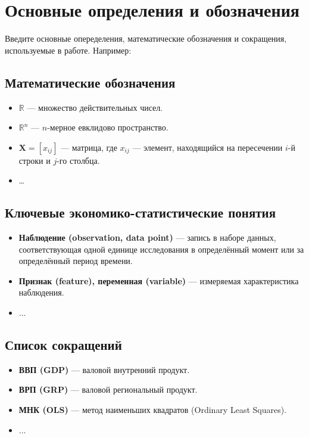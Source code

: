 \documentclass[a4paper,12pt]{article}
\begin{document}
\newpage

\section{Основные определения и обозначения}
\label{sec:definitions}

Введите основные опеределения, математические обозначения и сокращения, используемые в работе. Например:

\subsection*{Математические обозначения}

\begin{itemize}
    \item $\mathbb{R}$ --- множество действительных чисел.
    \item $\mathbb{R}^n$ --- $n$-мерное евклидово пространство.
    \item $\mathbf{X} = [x_{ij}]$ --- матрица, где $x_{ij}$ --- элемент, находящийся на пересечении $i$-й строки и $j$-го столбца.
    \item \ldots
\end{itemize}

\subsection*{Ключевые экономико-статистические понятия}

\begin{itemize}
    \item \textbf{Наблюдение (observation, data point)} --- запись в наборе данных, соответствующая одной единице исследования в определённый момент или за определённый период времени.
    \item \textbf{Признак (feature), переменная (variable)} --- измеряемая характеристика наблюдения.
    \item ...
\end{itemize}

\subsection*{Список сокращений}

\begin{itemize}
    \item \textbf{ВВП (GDP)} --- валовой внутренний продукт.
    \item \textbf{ВРП (GRP)} --- валовой региональный продукт.
    \item \textbf{МНК (OLS)} --- метод наименьших квадратов (Ordinary Least Squares).
    \item ...
\end{itemize}
\end{document}

